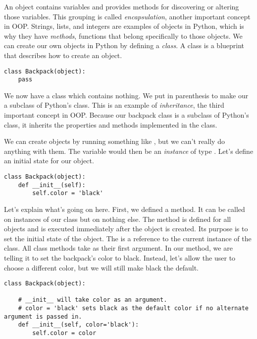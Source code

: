 An object contains variables and provides methods for discovering or altering those variables.
This grouping is called \emph{encapsulation}, another important concept in OOP.
Strings, lists, and integers are examples of objects in Python, which is why they have \emph{methods}, functions that belong specifically to those objects.
We can create our own objects in Python by defining a \emph{class}.
A class is a blueprint that describes how to create an object.

\begin{lstlisting}
class Backpack(object):
    pass
\end{lstlisting}

We now have a class  which contains nothing.
We put  in parenthesis to make our  a subclass of Python's  class.
This is an example of \emph{inheritance}, the third important concept in OOP.
Because our backpack class is a subclass of Python's  class, it inherits the properties and methods implemented in the  class.

We can create  objects by running something like , but we can't really do anything with them.
The variable  would then be an \emph{instance} of type .
Let's define an initial state for our object.

\begin{lstlisting}
class Backpack(object):
    def __init__(self):
        self.color = 'black'
\end{lstlisting}

Let's explain what's going on here.
First, we defined a method.
It can be called on instances of our class but on nothing else.
The  method is defined for all objects and is executed immediately after the object is created.
Its purpose is to set the initial state of the object.
The  is a reference to the current instance of the class.
All class methods take  as their first argument.
In our  method, we are telling it to set the backpack's color to black.
Instead, let's allow the user to choose a different color, but we will still make black the default.

\begin{lstlisting}
class Backpack(object):

    # __init__ will take color as an argument.
    # color = 'black' sets black as the default color if no alternate argument is passed in.
    def __init__(self, color='black'):
        self.color = color
\end{lstlisting}

